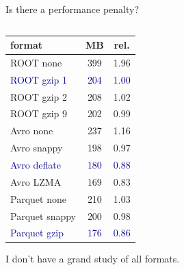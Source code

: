 \documentclass{beamer}
\begin{document}
\begin{frame}{Is there a performance penalty?}
\begin{columns}
\begin{column}{0.5\linewidth}
\begin{onlyenv}
\begin{center}
\vspace{0.25 cm}
\small
\begin{tabular}{l c c}
format         & MB  & rel. \\\hline
ROOT none      & 399 & 1.96 \\
\textcolor{darkblue}{ROOT gzip 1}    & \textcolor{darkblue}{204} & \textcolor{darkblue}{1.00} \\
ROOT gzip 2    & 208 & 1.02 \\
ROOT gzip 9    & 202 & 0.99 \\\hline
Avro none      & 237 & 1.16 \\
Avro snappy    & 198 & 0.97 \\
\textcolor{darkblue}{Avro deflate}   & \textcolor{darkblue}{180} & \textcolor{darkblue}{0.88} \\
Avro LZMA      & 169 & 0.83 \\\hline
Parquet none   & 210 & 1.03 \\
Parquet snappy & 200 & 0.98 \\
\textcolor{darkblue}{Parquet gzip}   & \textcolor{darkblue}{176} & \textcolor{darkblue}{0.86} \\
\end{tabular}

\vspace{0.25 cm}
\scriptsize I don't have a grand study of all formats.
\end{center}
\end{onlyenv}
\end{column}
\end{columns}
\end{frame}
\end{document}
